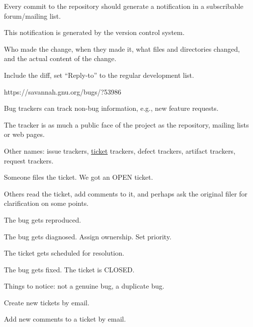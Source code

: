 \documentclass[landscape,30pt]{foils}
\begin{document}

Every commit to the repository should generate a notification in a subscribable forum/mailing list.

This notification is generated by the version control system.

Who made the change, when they made it, what files and directories changed, and the actual content of the change.

Include the diff, set ``Reply-to'' to the regular development list.


https://savannah.gnu.org/bugs/?53986

Bug trackers can track non-bug information, e.g., new feature requests.

The tracker is as much a public face of the project as the repository, mailing lists or web pages.

Other names:  issue trackers, \underline{ticket} trackers, defect trackers, artifact trackers, request trackers.


Someone files the ticket.  We got an OPEN ticket.

Others read the ticket, add comments to it, and perhaps ask the original filer for clarification on some points.

The bug gets reproduced.

The bug gets diagnosed.  Assign ownership.  Set priority.

The ticket gets scheduled for resolution.

The bug gets fixed.  The ticket is CLOSED.

Things to notice: not a genuine bug, a duplicate bug.



Create new tickets by email.

Add new comments to a ticket by email.
\end{document}
